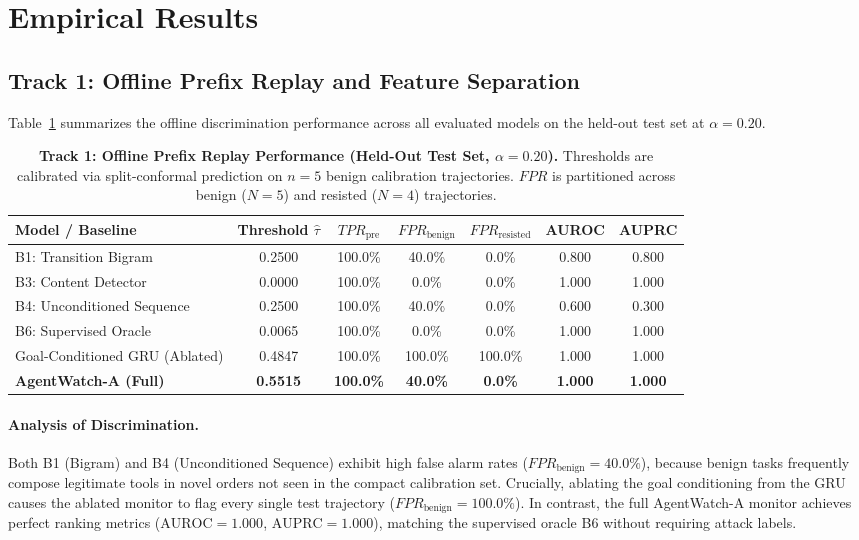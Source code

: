 \documentclass[11pt,a4paper]{article}
\begin{document}
\section{Empirical Results}
\label{sec:results}

\subsection{Track 1: Offline Prefix Replay and Feature Separation}

Table~\ref{tab:track1} summarizes the offline discrimination performance across all evaluated models on the held-out test set at $\alpha = 0.20$.

\begin{table}[h!]
\centering
\small
\caption{\textbf{Track 1: Offline Prefix Replay Performance (Held-Out Test Set, $\alpha = 0.20$).} Thresholds are calibrated via split-conformal prediction on $n=5$ benign calibration trajectories. $FPR$ is partitioned across benign ($N=5$) and resisted ($N=4$) trajectories.}
\label{tab:track1}
\begin{tabular}{lcccccc}
\toprule
\textbf{Model / Baseline} & \textbf{Threshold $\hat{\tau}$} & \textbf{$TPR_{\text{pre}}$} & \textbf{$FPR_{\text{benign}}$} & \textbf{$FPR_{\text{resisted}}$} & \textbf{AUROC} & \textbf{AUPRC} \\
\midrule
B1: Transition Bigram         & 0.2500 & 100.0\% & 40.0\% & 0.0\%   & 0.800 & 0.800 \\
B3: Content Detector          & 0.0000 & 100.0\% & 0.0\%  & 0.0\%   & 1.000 & 1.000 \\
B4: Unconditioned Sequence    & 0.2500 & 100.0\% & 40.0\% & 0.0\%   & 0.600 & 0.300 \\
B6: Supervised Oracle         & 0.0065 & 100.0\% & 0.0\%  & 0.0\%   & 1.000 & 1.000 \\
\midrule
Goal-Conditioned GRU (Ablated)& 0.4847 & 100.0\% & 100.0\% & 100.0\% & 1.000 & 1.000 \\
\textbf{AgentWatch-A (Full)}  & \textbf{0.5515} & \textbf{100.0\%} & \textbf{40.0\%} & \textbf{0.0\%} & \textbf{1.000} & \textbf{1.000} \\
\bottomrule
\end{tabular}
\end{table}

\paragraph{Analysis of Discrimination.}
Both B1 (Bigram) and B4 (Unconditioned Sequence) exhibit high false alarm rates ($FPR_{\text{benign}} = 40.0\%$), because benign tasks frequently compose legitimate tools in novel orders not seen in the compact calibration set. Crucially, ablating the goal conditioning from the GRU causes the ablated monitor to flag every single test trajectory ($FPR_{\text{benign}} = 100.0\%$). In contrast, the full AgentWatch-A monitor achieves perfect ranking metrics ($\text{AUROC} = 1.000$, $\text{AUPRC} = 1.000$), matching the supervised oracle B6 without requiring attack labels.
\end{document}
